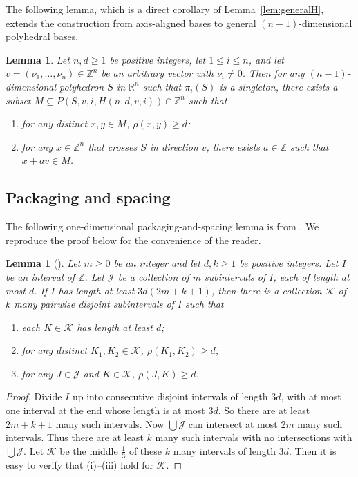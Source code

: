 \documentclass[10pt,a4paper]{amsart}
\newtheorem{lemma}[theorem]{Lemma}
\begin{document}
The following lemma, which is a direct corollary of Lemma~\ref{lem:generalH}, extends the construction from axis-aligned bases to general $(n-1)$-dimensional polyhedral bases.

\begin{lemma}\label{lem:H}
Let $n, d\geq 1$ be positive integers, let $1\leq i\leq n$, and let $v=(\nu_1,\dots, \nu_n)\in\mathbb{Z}^n$ be an arbitrary vector with $\nu_i\neq 0$. Then for any $(n-1)$-dimensional polyhedron $S$ in $\mathbb{R}^n$ such that $\pi_i(S)$ is a singleton, there exists a subset $M\subseteq P(S, v, i, H(n, d, v, i))\cap\mathbb{Z}^n$ such that
\begin{enumerate}
\item[(1)] for any distinct $x,y\in M$, $\rho(x,y)\geq d$;
\item[(2)] for any $x\in \mathbb{Z}^n$ that crosses $S$ in direction $v$, there exists $a\in\mathbb{Z}$ such that $x+av\in M$.
\end{enumerate}
\end{lemma}



\subsection{Packaging and spacing}

The following one-dimensional packaging-and-spacing lemma is from \cite{GW25}. We reproduce the proof below for the convenience of the reader.

\begin{lemma}[{\cite[Lemma 3.2]{GW25}}]\label{lem:dim1packaging}
Let $m\geq 0$ be an integer and let $d, k\geq 1$ be positive integers.
Let $I$ be an interval of $\mathbb{Z}$. Let $\mathcal{J}$ be a collection
of $m$ subintervals of $I$, each of length at most $d$. If $I$ has length
at least $3d(2m+k+1)$, then there is a collection $\mathcal{K}$ of $k$ many
pairwise disjoint subintervals of $I$ such that
\begin{enumerate}
\item[(i)] each $K\in\mathcal{K}$ has length at least $d$;
\item[(ii)] for any distinct $K_1, K_2\in\mathcal{K}$,
$\rho(K_1, K_2)\geq d$;
\item[(iii)] for any $J\in\mathcal{J}$ and $K\in\mathcal{K}$,
$\rho(J, K)\geq d$.
\end{enumerate}
\end{lemma}

\begin{proof} Divide $I$ up into consecutive disjoint intervals of length $3d$, with at most one interval at the end whose length is at most $3d$. So there are at least $2m+k+1$ many such intervals. Now $\bigcup \mathcal{J}$ can intersect at most $2m$ many such intervals. Thus there are at least $k$ many such intervals with no intersections with $\bigcup\mathcal{J}$. Let $\mathcal{K}$ be the middle $\frac{1}{3}$ of these $k$ many intervals of length $3d$. Then it is easy to verify that (i)--(iii) hold for $\mathcal{K}$.
\end{proof}
\end{document}
